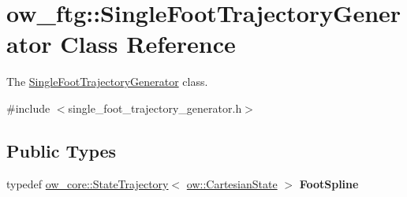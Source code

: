 \hypertarget{classow__ftg_1_1SingleFootTrajectoryGenerator}{}\section{ow\+\_\+ftg\+:\+:Single\+Foot\+Trajectory\+Generator Class Reference}
\label{classow__ftg_1_1SingleFootTrajectoryGenerator}


The \hyperlink{classow__ftg_1_1SingleFootTrajectoryGenerator}{Single\+Foot\+Trajectory\+Generator} class.  




{\ttfamily \#include $<$single\+\_\+foot\+\_\+trajectory\+\_\+generator.\+h$>$}

\subsection*{Public Types}
\begin{DoxyCompactItemize}
\item 
typedef \hyperlink{classow__core_1_1StateTrajectory}{ow\+\_\+core\+::\+State\+Trajectory}$<$ \hyperlink{classow__core_1_1CartesianState}{ow\+::\+Cartesian\+State} $>$ {\bfseries Foot\+Spline}\hypertarget{classow__ftg_1_1SingleFootTrajectoryGenerator_a9a18d6d147158e93ea33786f927a9d3e}{}\label{classow__ftg_1_1SingleFootTrajectoryGenerator_a9a18d6d147158e93ea33786f927a9d3e}

\end{DoxyCompactItemize}
